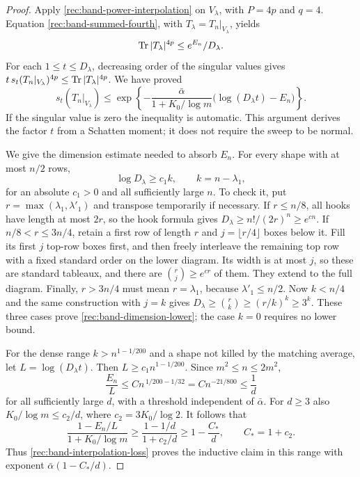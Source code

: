 \begin{proof}
Apply \eqref{rec:band-power-interpolation} on $V_\lambda$,
with $P=4p$ and $q=4$.  Equation
\eqref{rec:band-summed-fourth}, with
$T_\lambda=T_n|_{V_\lambda}$, yields
\[
 \operatorname{Tr}|T_\lambda|^{4p}\le e^{E_n}/D_\lambda.
\]
For each $1\le t\le D_\lambda$, decreasing order of the
singular values gives
$t\,s_t(T_n|_{V_\lambda})^{4p}
\le\operatorname{Tr}|T_\lambda|^{4p}$.
We have proved
\begin{equation}\label{rec:band-interpolation-loss}
 s_t(T_n|_{V_\lambda})
 \le
 \exp\left\{-\frac{\bar\alpha}{1+K_0/\log m}
                  \big(\log(D_\lambda t)-E_n\big)\right\}.
\end{equation}
If the singular value is zero the inequality is automatic.
This argument derives the factor $t$ from a Schatten moment;
it does not require the sweep to be normal.

We give the dimension estimate needed to absorb $E_n$.
For every shape with at most $n/2$ rows,
\begin{equation}\label{rec:band-dimension-lower}
 \log D_\lambda\ge c_1 k,\qquad k=n-\lambda_1,
\end{equation}
for an absolute $c_1>0$ and all sufficiently large $n$.
To check it, put $r=\max(\lambda_1,\lambda'_1)$ and transpose
temporarily if necessary.  If $r\le n/8$, all hooks have
length at most $2r$, so the hook formula gives
$D_\lambda\ge n!/(2r)^n\ge e^{c n}$.
If $n/8<r\le3n/4$, retain a first row of length $r$ and
$j=\lfloor r/4\rfloor$ boxes below it.  Fill its first $j$
top-row boxes first, and then freely interleave the remaining
top row with a fixed standard order on the lower diagram.
Its width is at most $j$, so these are standard tableaux,
and there are $\binom rj\ge e^{c r}$ of them.
They extend to the full diagram.  Finally, $r>3n/4$ must
mean $r=\lambda_1$, because $\lambda'_1\le n/2$.
Now $k<n/4$ and the same construction with $j=k$ gives
$D_\lambda\ge\binom rk\ge(r/k)^k\ge3^k$.
These three cases prove \eqref{rec:band-dimension-lower};
the case $k=0$ requires no lower bound.

For the dense range $k>n^{1-1/200}$ and a shape not killed
by the matching average, let $L=\log(D_\lambda t)$.
Then $L\ge c_1n^{1-1/200}$.  Since $m^2\le n\le2m^2$,
\[
 \frac{E_n}{L}
 \le C n^{\,1/200-1/32}
 =C n^{-21/800}\le\frac1d
\]
for all sufficiently large $d$, with a threshold independent
of $\bar\alpha$.  For $d\ge3$ also
$K_0/\log m\le c_2/d$, where $c_2=3K_0/\log2$.
It follows that
\[
 \frac{1-E_n/L}{1+K_0/\log m}
 \ge\frac{1-1/d}{1+c_2/d}
 \ge1-\frac{C_*}{d},\qquad C_*=1+c_2.
\]
Thus \eqref{rec:band-interpolation-loss} proves the
inductive claim in this range with exponent
$\bar\alpha(1-C_*/d)$.


\end{proof}
